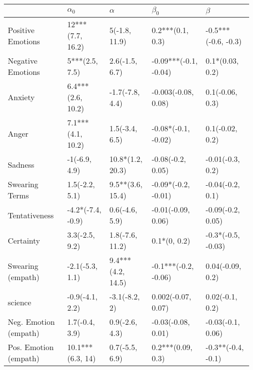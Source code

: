 \begin{tabular}{lllll}
\toprule
{} &         $\alpha_0$ &           $\alpha$ &              $\beta_0$ &              $\beta$ \\
\midrule
Positive Emotions     &   12***(7.7, 16.2) &      5(-1.8, 11.9) &       0.2***(0.1, 0.3) &  -0.5***(-0.6, -0.3) \\
Negative Emotions     &     5***(2.5, 7.5) &     2.6(-1.5, 6.7) &  -0.09***(-0.1, -0.04) &      0.1*(0.03, 0.2) \\
Anxiety               &  6.4***(2.6, 10.2) &    -1.7(-7.8, 4.4) &    -0.003(-0.08, 0.08) &      0.1(-0.06, 0.3) \\
Anger                 &  7.1***(4.1, 10.2) &     1.5(-3.4, 6.5) &    -0.08*(-0.1, -0.02) &      0.1(-0.02, 0.2) \\
Sadness               &      -1(-6.9, 4.9) &   10.8*(1.2, 20.3) &      -0.08(-0.2, 0.05) &     -0.01(-0.3, 0.2) \\
Swearing Terms        &     1.5(-2.2, 5.1) &   9.5**(3.6, 15.4) &    -0.09*(-0.2, -0.01) &     -0.04(-0.2, 0.1) \\
Tentativeness         &  -4.2*(-7.4, -0.9) &     0.6(-4.6, 5.9) &     -0.01(-0.09, 0.06) &    -0.09(-0.2, 0.05) \\
Certainty             &     3.3(-2.5, 9.2) &    1.8(-7.6, 11.2) &           0.1*(0, 0.2) &   -0.3*(-0.5, -0.03) \\
Swearing (empath)     &    -2.1(-5.3, 1.1) &  9.4***(4.2, 14.5) &   -0.1***(-0.2, -0.06) &     0.04(-0.09, 0.2) \\
science               &    -0.9(-4.1, 2.2) &      -3.1(-8.2, 2) &     0.002(-0.07, 0.07) &      0.02(-0.1, 0.2) \\
Neg. Emotion (empath) &     1.7(-0.4, 3.9) &     0.9(-2.6, 4.3) &     -0.03(-0.08, 0.01) &    -0.03(-0.1, 0.06) \\
Pos. Emotion (empath) &   10.1***(6.3, 14) &     0.7(-5.5, 6.9) &      0.2***(0.09, 0.3) &   -0.3**(-0.4, -0.1) \\
\bottomrule
\end{tabular}
